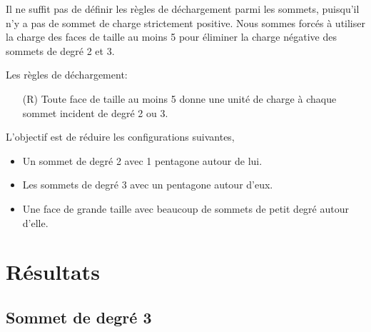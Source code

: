 \documentclass{beamer}
\begin{document}
\begin{frame}
Il ne suffit pas de définir les règles de déchargement parmi les sommets, puisqu'il n'y a pas de sommet de charge strictement positive. Nous sommes forcés à utiliser la charge des faces de taille au moins 5 pour éliminer la charge négative des sommets de degré 2 et 3.

Les règles de déchargement:

\begin{enumerate}
\item [(R)] Toute face de taille au moins 5 donne une unité de charge à chaque sommet incident de degré 2 ou 3.
\end{enumerate}
\end{frame}

\begin{frame}

L'objectif est de réduire les configurations suivantes,
\begin{itemize}
\item Un sommet de degré 2 avec 1 pentagone autour de lui.
\item Les sommets de degré 3 avec un pentagone autour d'eux.
\item Une face de grande taille avec beaucoup de sommets de petit degré autour d'elle.
\end{itemize}
\end{frame}

\section{Résultats}

\subsection{Sommet de degré 3}
\begin{frame}
\end{frame}

\begin{frame}
\end{frame}

\begin{frame}
\end{frame}

\begin{frame}
\end{frame}
\end{document}
